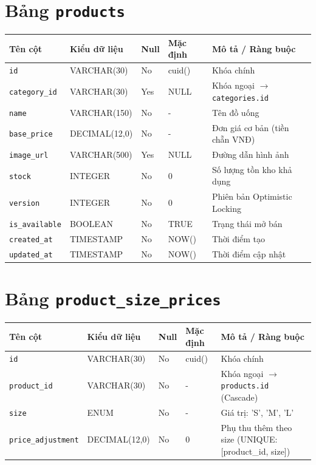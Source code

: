 \section{Bảng \texttt{products}}
\begin{table}[htbp]
\centering
\small
\begin{tabularx}{\textwidth}{llllX}
\toprule
\textbf{Tên cột} & \textbf{Kiểu dữ liệu} & \textbf{Null} & \textbf{Mặc định} & \textbf{Mô tả / Ràng buộc} \\
\midrule
\texttt{id} & VARCHAR(30) & No & cuid() & Khóa chính \\
\texttt{category\_id} & VARCHAR(30) & Yes & NULL & Khóa ngoại \(\to\) \texttt{categories.id} \\
\texttt{name} & VARCHAR(150) & No & - & Tên đồ uống \\
\texttt{base\_price} & DECIMAL(12,0) & No & - & Đơn giá cơ bản (tiền chẵn VNĐ) \\
\texttt{image\_url} & VARCHAR(500) & Yes & NULL & Đường dẫn hình ảnh \\
\texttt{stock} & INTEGER & No & 0 & Số lượng tồn kho khả dụng \\
\texttt{version} & INTEGER & No & 0 & Phiên bản Optimistic Locking \\
\texttt{is\_available} & BOOLEAN & No & TRUE & Trạng thái mở bán \\
\texttt{created\_at} & TIMESTAMP & No & NOW() & Thời điểm tạo \\
\texttt{updated\_at} & TIMESTAMP & No & NOW() & Thời điểm cập nhật \\
\bottomrule
\end{tabularx}
\end{table}

\section{Bảng \texttt{product\_size\_prices}}
\begin{table}[htbp]
\centering
\small
\begin{tabularx}{\textwidth}{llllX}
\toprule
\textbf{Tên cột} & \textbf{Kiểu dữ liệu} & \textbf{Null} & \textbf{Mặc định} & \textbf{Mô tả / Ràng buộc} \\
\midrule
\texttt{id} & VARCHAR(30) & No & cuid() & Khóa chính \\
\texttt{product\_id} & VARCHAR(30) & No & - & Khóa ngoại \(\to\) \texttt{products.id} (Cascade) \\
\texttt{size} & ENUM & No & - & Giá trị: 'S', 'M', 'L' \\
\texttt{price\_adjustment} & DECIMAL(12,0) & No & 0 & Phụ thu thêm theo size (UNIQUE:[product\_id, size]) \\
\bottomrule
\end{tabularx}
\end{table}

